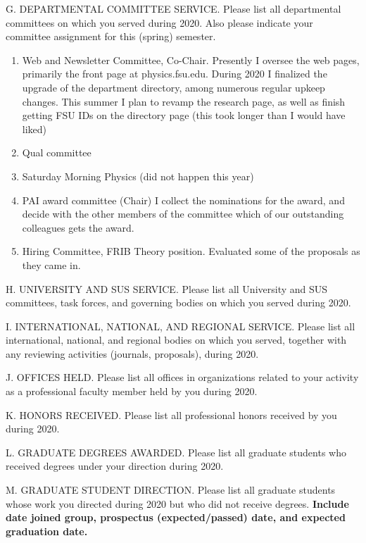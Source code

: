 \noindent G. DEPARTMENTAL COMMITTEE SERVICE. Please list all
departmental committees on which you served during 2020.  Also
please indicate your committee assignment for this (spring)
semester.
\bigskip
%
\begin{enumerate}
    \item Web and Newsletter Committee, Co-Chair.  Presently I oversee the web
        pages, primarily the front page at physics.fsu.edu.  During 2020 I
        finalized the upgrade of the department directory, among numerous
        regular upkeep changes.  This summer I plan to revamp the research page,
        as well as finish getting FSU IDs on the directory page (this took
        longer than I would have liked)
    \item Qual committee
    \item Saturday Morning Physics (did not happen this year)
    \item PAI award committee (Chair) I collect the nominations for the award, and
        decide with the other members of the committee which of our outstanding
        colleagues gets the award.
    \item Hiring Committee, FRIB Theory position.  Evaluated some of the
        proposals as they came in.  
\end{enumerate}

\noindent H. UNIVERSITY AND SUS SERVICE. Please list all University
and SUS committees, task forces, and governing bodies on which you
served during 2020.
\bigskip
%

\noindent I. INTERNATIONAL, NATIONAL, AND REGIONAL  SERVICE. Please
list all international, national, and regional bodies on which you
served, together with any reviewing activities (journals,
proposals), during 2020.
\bigskip

\noindent J. OFFICES HELD. Please list all offices in organizations
related to your activity as a professional faculty member held by
you during 2020.
\bigskip

\noindent K. HONORS RECEIVED. Please list all professional honors
received by you during 2020.
\bigskip

\noindent L. GRADUATE DEGREES AWARDED. Please list all graduate
students who received degrees under your direction during 2020.
\bigskip

\noindent M. GRADUATE STUDENT DIRECTION. Please list all graduate
students whose work you directed during 2020 but who did not receive
degrees. {\bf Include date joined group, prospectus (expected/passed) date, 
and expected graduation date.}

